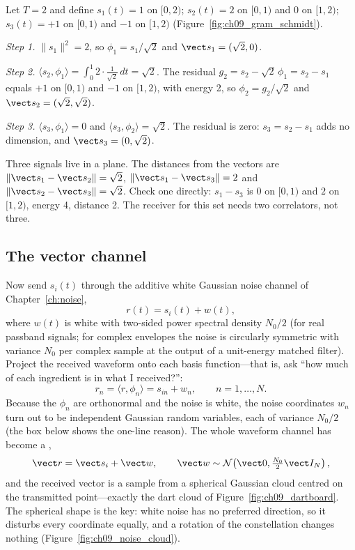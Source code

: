 \begin{worked}
Let $T=2$ and define $s_1(t)=1$ on $[0,2)$; $s_2(t)=2$ on $[0,1)$ and $0$ on $[1,2)$;
$s_3(t)=+1$ on $[0,1)$ and $-1$ on $[1,2)$ (Figure~\ref{fig:ch09_gram_schmidt}).

\emph{Step 1.} $\|s_1\|^2=2$, so $\phi_1=s_1/\sqrt2$ and $\vect s_1=(\sqrt2,0)$.

\emph{Step 2.} $\langle s_2,\phi_1\rangle=\int_0^1 2\cdot\tfrac1{\sqrt2}\,dt=\sqrt2$. The
residual $g_2=s_2-\sqrt2\,\phi_1=s_2-s_1$ equals $+1$ on $[0,1)$ and $-1$ on $[1,2)$, with
energy 2, so $\phi_2=g_2/\sqrt2$ and $\vect s_2=(\sqrt2,\sqrt2)$.

\emph{Step 3.} $\langle s_3,\phi_1\rangle=0$ and $\langle s_3,\phi_2\rangle=\sqrt2$. The residual
is zero: $s_3=s_2-s_1$ adds no dimension, and $\vect s_3=(0,\sqrt2)$.

Three signals live in a plane. The distances from the vectors are
$\|\vect s_1-\vect s_2\|=\sqrt2$, $\|\vect s_1-\vect s_3\|=2$ and
$\|\vect s_2-\vect s_3\|=\sqrt2$. Check one directly: $s_1-s_3$ is $0$ on $[0,1)$ and $2$ on
$[1,2)$, energy 4, distance 2. The receiver for this set needs two correlators, not three.
\end{worked}

\subsection{The vector channel}

Now send $s_i(t)$ through the additive white Gaussian noise channel of Chapter~\ref{ch:noise},
\begin{equation}
r(t)=s_i(t)+w(t),
\end{equation}
where $w(t)$ is white with two-sided power spectral density $N_0/2$ (for real passband signals;
for complex envelopes the noise is circularly symmetric with variance $N_0$ per complex sample at
the output of a unit-energy matched filter). Project the received waveform onto each basis
function---that is, ask ``how much of each ingredient is in what I received?'':
\begin{equation}
r_n=\langle r,\phi_n\rangle=s_{in}+w_n,\qquad n=1,\dots,N .
\label{eq:ch09:project}
\end{equation}
Because the $\phi_n$ are orthonormal and the noise is white, the noise coordinates $w_n$ turn out
to be independent Gaussian random variables, each of variance $N_0/2$ (the box below shows the
one-line reason). The whole waveform channel has become a ,
\begin{equation}
\vect r=\vect s_i+\vect w,\qquad \vect w\sim\mathcal N\!\left(\vect 0,\tfrac{N_0}{2}\vect I_N\right),
\label{eq:ch09:vecchan}
\end{equation}
and the received vector is a sample from a spherical Gaussian cloud centred on the transmitted
point---exactly the dart cloud of Figure~\ref{fig:ch09_dartboard}. The spherical shape is the
key: white noise has no preferred direction, so it disturbs every coordinate equally, and a
rotation of the constellation changes nothing
(Figure~\ref{fig:ch09_noise_cloud}).

